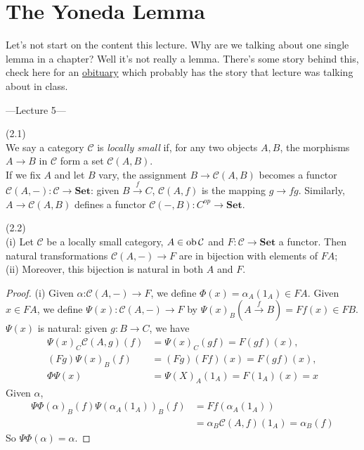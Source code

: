 \documentclass[a4paper]{article}
\begin{document}
\newpage

\section{The Yoneda Lemma}
Let's not start on the content this lecture. Why are we talking about one single lemma in a chapter? Well it's not really a lemma. There's some story behind this, check here for an \href{https://www.mta.ca/~cat-dist/catlist/1999/yoneda}{obituary} which probably has the story that lecture was talking about in class.

---Lecture 5---
\begin{defi} (2.1)\\
    We say a category $\mathcal{C}$ is \emph{locally small} if, for any two objects $A,B$, the morphisms $A\to B$ in $\mathcal{C}$ form a set $\mathcal{C}(A,B)$.\\
    If we fix $A$ and let $B$ vary, the assignment $B \to \mathcal{C}(A,B)$ becomes a functor $\mathcal{C}(A,-):\mathcal{C} \to \mathbf{Set}$: given $B \xrightarrow{f} C$, $\mathcal{C}(A,f)$ is the mapping $g \to fg$. Similarly, $A \to \mathcal{C}(A,B)$ defines a functor $\mathcal{C}(-,B):C^{op} \to \mathbf{Set}$.
\end{defi}

\begin{lemma} (2.2)\\
    (i) Let $\mathcal{C}$ be a locally small category, $A \in \operatorname{ob} \mathcal{C}$ and $F:\mathcal{C} \to \mathbf{Set}$ a functor. Then natural transformations $\mathcal{C}(A,-) \to F$ are in bijection with elements of $FA$;\\
    (ii) Moreover, this bijection is natural in both $A$ and $F$.
    \begin{proof}
        (i) Given $\alpha$:$\mathcal{C}(A,-) \to F$, we define $\Phi(x) = \alpha_A(1_A) \in FA$. Given $x \in FA$, we define $\Psi(x): \mathcal{C}(A,-) \to F$ by $\Psi(x)_B (A \xrightarrow{f} B) = Ff(x) \in FB$.\\
        $\Psi(x)$ is natural: given $g:B \to C$, we have
        \begin{equation*}
            \begin{aligned}
                \Psi(x)_C \mathcal{C}(A,g) (f) &= \Psi(x)_C (gf) = F(gf)(x),\\
                (Fg) \Psi(x)_B(f) &= (Fg)(Ff)(x) = F(gf)(x),\\
                \Phi\Psi(x) &= \Psi(X)_A (1_A) = F(1_A)(x) = x
            \end{aligned}
        \end{equation*}
        Given $\alpha$,
        \begin{equation*}
            \begin{aligned}
                \Psi\Phi(\alpha)_B(f) \Psi(\alpha_A(1_A))_B(f) &= Ff(\alpha_A(1_A))\\
                &= \alpha_B\mathcal{C}(A,f)(1_A) = \alpha_B(f)
            \end{aligned}
        \end{equation*}
        So $\Psi\Phi(\alpha)=\alpha$.
    \end{proof}
\end{lemma}
\end{document}

